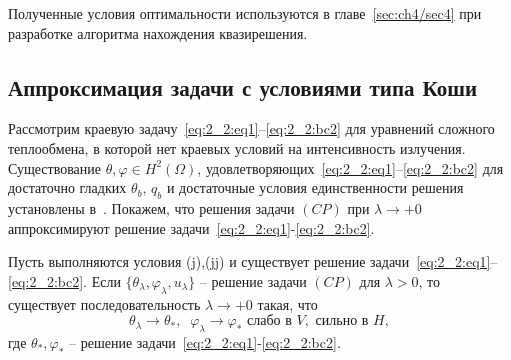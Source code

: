 Полученные условия оптимальности используются в главе~\ref{sec:ch4/sec4} при разработке алгоритма
нахождения квазирешения.

\subsection{Аппроксимация задачи с условиями типа Коши}
\label{subsec:ch2/sec2/approximation}

Рассмотрим краевую задачу~\eqref{eq:2_2:eq1}--\eqref{eq:2_2:bc2} для
уравнений сложного теплообмена, в которой нет краевых условий
на интенсивность излучения.
Существование $\theta,\varphi\in H^2(\Omega)$,
удовлетворяющих~\eqref{eq:2_2:eq1}--\eqref{eq:2_2:bc2} для достаточно гладких
$\theta_b,\, q_b$ и достаточные условия единственности решения
установлены в~\cite{CMMP20}.
Покажем, что решения задачи $(CP)$ при $\lambda\to+0$
аппроксимируют решение задачи~\eqref{eq:2_2:eq1}-\eqref{eq:2_2:bc2}.


\begin{theorem}
    \label{th:2_2:3}
    Пусть выполняются условия (j),(jj) и существует решение
    задачи~\eqref{eq:2_2:eq1}--\eqref{eq:2_2:bc2}.
    Если $\{\theta_\lambda,\varphi_\lambda,u_\lambda\}$ -- решение
    задачи $(CP)$ для $\lambda>0$, то существует последовательность $\lambda\to +0$
    такая, что
    \[
        \theta_\lambda\rightarrow\theta_*, \;\; \varphi_\lambda\rightarrow\varphi_*
        \text{ слабо в }V,\text{ сильно в }H,
    \]
    где $\theta_*,\varphi_*$ -- решение задачи~\eqref{eq:2_2:eq1}-\eqref{eq:2_2:bc2}.
\end{theorem}

